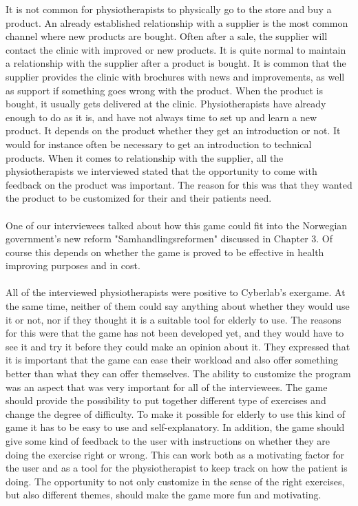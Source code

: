 It is not common for physiotherapists to physically go to the store and buy a product. An already established relationship with a supplier is the most common channel where new products are bought. Often after a sale, the supplier will contact the clinic with improved or new products. It is quite normal to maintain a relationship with the supplier after a product is bought. It is common that the supplier provides the clinic with brochures with news and improvements, as well as support if something goes wrong with the product. When the product is bought, it usually gets delivered at the clinic. Physiotherapists have already enough to do as it is, and have not always time to set up and learn a new product. It depends on the product whether they get an introduction or not. It would for instance often be necessary to get an introduction to technical products. When it comes to relationship with the supplier, all the physiotherapists we interviewed stated that the opportunity to come with feedback on the product was important. The reason for this was that they wanted the product to be customized for their and their patients need. \\ \\
One of our interviewees talked about how this game could fit into the Norwegian government’s new reform "Samhandlingsreformen" discussed in Chapter 3. Of course this depends on whether the game is proved to be effective in health improving purposes and in cost.  \\ \\
All of the interviewed physiotherapists were positive to Cyberlab’s exergame. At the same time, neither of them could say anything about whether they would use it or not, nor if they thought it is a suitable tool for elderly to use. The reasons for this were that the game has not been developed yet, and they would have to see it and try it before they could make an opinion about it. They expressed that it is important that the game can ease their workload and also offer something better than what they can offer themselves. The ability to customize the program was an aspect that was very important for all of the interviewees. The game should provide the possibility to put together different type of exercises and change the degree of difficulty. To make it possible for elderly to use this kind of game it has to be easy to use and self-explanatory. In addition, the game should give some kind of feedback to the user with instructions on whether they are doing the exercise right or wrong. This can work both as a motivating factor for the user and as a tool for the physiotherapist to keep track on how the patient is doing. The opportunity to not only customize in the sense of the right exercises, but also different themes, should make the game more fun and motivating. \\ \\

